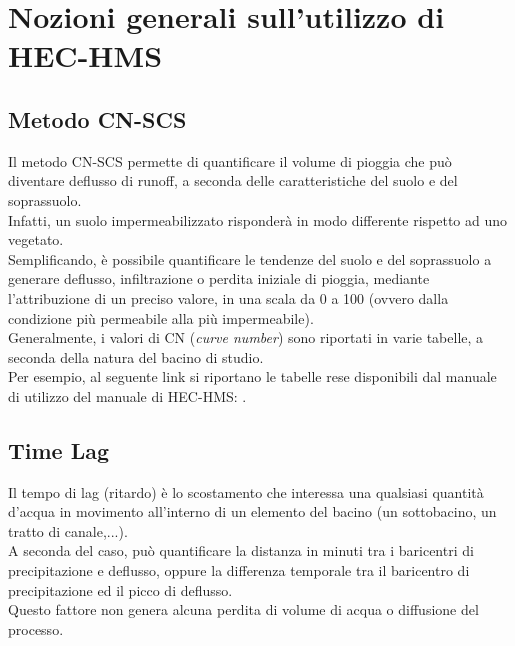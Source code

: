 \section{Nozioni generali sull'utilizzo di HEC-HMS}
\subsection{Metodo CN-SCS}
Il metodo CN-SCS permette di quantificare il volume di pioggia che può diventare deflusso di runoff, a seconda delle caratteristiche del suolo e del soprassuolo.\\
Infatti, un suolo impermeabilizzato risponderà in modo differente rispetto ad uno vegetato.\\
Semplificando, è possibile quantificare le tendenze del suolo e del soprassuolo a generare deflusso, infiltrazione o perdita iniziale di pioggia, mediante l'attribuzione di un preciso valore, in una scala da 0 a 100 (ovvero dalla condizione più permeabile alla più impermeabile).\\
Generalmente, i valori di CN (\textit{curve number}) sono riportati in varie tabelle, a seconda della natura del bacino di studio.\\
Per esempio, al seguente link si riportano le tabelle rese disponibili dal manuale di utilizzo del manuale di HEC-HMS: \cite{cn_tables_hec_hms}.

\subsection{Time Lag}
Il tempo di lag (ritardo) è lo scostamento che interessa una qualsiasi quantità d'acqua in movimento all'interno di un elemento del bacino (un sottobacino, un tratto di canale,...).\\
A seconda del caso, può quantificare la distanza in minuti tra i baricentri di precipitazione e deflusso, oppure la differenza temporale tra il baricentro di precipitazione ed il picco di deflusso.\\
Questo fattore non genera alcuna perdita di volume di acqua o diffusione del processo. 